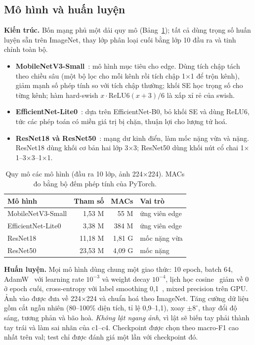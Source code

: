 \documentclass[10pt,a4paper,twocolumn]{article}
\begin{document}
\subsection{Mô hình và huấn luyện}
\textbf{Kiến trúc.} Bốn mạng phủ một dải quy mô (Bảng~\ref{tab:models}); tất cả dùng trọng số huấn luyện sẵn trên ImageNet, thay lớp phân loại cuối bằng lớp 10 đầu ra và tinh chỉnh toàn bộ.
\begin{itemize}
\item \textbf{MobileNetV3-Small}~\cite{howard2019mobilenetv3}: mô hình mục tiêu cho edge. Dùng tích chập tách theo chiều sâu (một bộ lọc cho mỗi kênh rồi tích chập 1$\times$1 để trộn kênh), giảm mạnh số phép tính so với tích chập thường; khối SE học trọng số cho từng kênh; hàm hard-swish $x\cdot\mathrm{ReLU6}(x+3)/6$ là xấp xỉ rẻ của swish.
\item \textbf{EfficientNet-Lite0}~\cite{tan2019efficientnet,efficientnetlite}: dựa trên EfficientNet-B0, bỏ khối SE và dùng ReLU6, tức các phép toán có miền giá trị bị chặn, thuận lợi cho lượng tử hoá.
\item \textbf{ResNet18 và ResNet50}~\cite{he2016resnet}: mạng dư kinh điển, làm mốc nặng vừa và nặng. ResNet18 dùng khối cơ bản hai lớp 3$\times$3; ResNet50 dùng khối nút cổ chai 1$\times$1--3$\times$3--1$\times$1.
\end{itemize}

\begin{table}[t]
\centering\small
\caption{Quy mô các mô hình (đầu ra 10 lớp, ảnh 224$\times$224). MACs đo bằng bộ đếm phép tính của PyTorch.}
\label{tab:models}
\begin{tabular}{@{}lrrl@{}}
\toprule
Mô hình & Tham số & MACs & Vai trò \\
\midrule
MobileNetV3-Small & 1,53 M & 55 M & ứng viên edge \\
EfficientNet-Lite0 & 3,38 M & 384 M & ứng viên edge \\
ResNet18 & 11,18 M & 1,81 G & mốc nặng vừa \\
ResNet50 & 23,53 M & 4,09 G & mốc nặng \\
\bottomrule
\end{tabular}
\end{table}

\textbf{Huấn luyện.} Mọi mô hình dùng chung một giao thức: 10 epoch, batch 64, AdamW~\cite{loshchilov2019adamw} với learning rate $10^{-3}$ và weight decay $10^{-4}$, lịch học cosine~\cite{loshchilov2017sgdr} giảm về 0 ở epoch cuối, cross-entropy với label smoothing 0,1~\cite{szegedy2016rethinking}, mixed precision trên GPU. Ảnh vào được đưa về 224$\times$224 và chuẩn hoá theo ImageNet. Tăng cường dữ liệu gồm cắt ngẫu nhiên (80--100\% diện tích, tỉ lệ 0,9--1,1), xoay $\pm 8^\circ$, thay đổi độ sáng, tương phản và bão hoà. \emph{Không lật ngang ảnh}, vì lật sẽ biến tay phải thành tay trái và làm sai nhãn của c1--c4. Checkpoint được chọn theo macro-F1 cao nhất trên val; test chỉ được đánh giá một lần với checkpoint đó.
\end{document}
